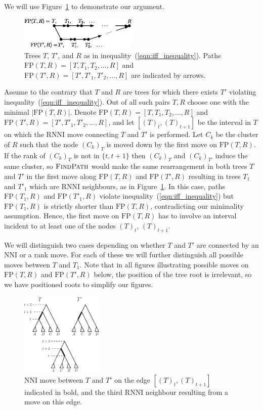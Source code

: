 \documentclass[11pt]{amsart}
\newcommand{\rnni}{\mathrm{RNNI}}
\newcommand{\findpath}{\textsc{FindPath}}
\newcommand{\nni}{\mathrm{NNI}}
\newcommand{\fp}{\mathrm{FP}}
\begin{document}
We will use Figure~\ref{fig:proof_idea} to demonstrate our argument.

\begin{figure}[ht]
\centering
\includegraphics[width=0.5\textwidth]{proof_idea_ag}
\caption{Trees $T$, $T'$, and $R$ as in inequality~(\ref{eqn:iff_inequality}).
Paths $\fp(T,R) = [T,T_1,T_2, \ldots, R]$ and $\fp(T',R) = [T',T'_1,T'_2, \ldots, R]$ are indicated by arrows.}
\label{fig:proof_idea}
\end{figure}

Assume to the contrary that $T$ and $R$ are trees for which there exists $T'$ violating inequality~(\ref{eqn:iff_inequality}).
Out of all such pairs $T, R$ choose one with the minimal $|\fp(T, R)|$.
Denote $\fp(T,R) = [T, T_1, T_2, \ldots, R]$ and $\fp(T', R) = [T', T'_1, T'_2, \ldots, R]$, and let $[(T)_t, (T)_{t+1}]$ be the interval in $T$ on which the $\rnni$ move connecting $T$ and $T'$ is performed.
Let $C_k$ be the cluster of $R$ such that the node $(C_k)_T$ is moved down by the first move on $\fp(T, R)$.
If the rank of $(C_k)_T$ is not in $\{t, t+1\}$ then $(C_k)_T$ and $(C_k)_{T'}$ induce the same cluster, so $\findpath$ would make the same rearrangement in both trees $T$ and $T'$ in the first move along $\fp(T, R)$ and $\fp(T', R)$ resulting in trees $T_1$ and $T'_1$ which are $\rnni$ neighbours, as in Figure~\ref{fig:proof_idea}.
In this case, paths $\fp(T_1, R)$ and $\fp(T'_1, R)$ violate inequality~(\ref{eqn:iff_inequality}) but $\fp(T_1, R)$ is strictly shorter than $\fp(T, R)$, contradicting our minimality assumption.
Hence, the first move on $\fp(T, R)$ has to involve an interval incident to at least one of the nodes $(T)_t$, $(T)_{t+1}$.

We will distinguish two cases depending on whether $T$ and $T'$ are connected by an $\nni$ or a rank move.
For each of these we will further distinguish all possible moves between $T$ and $T_1$.
Note that in all figures illustrating possible moves on $\fp(T,R)$ and $\fp(T',R)$ below, the position of the tree root is irrelevant, so we have positioned roots to simplify our figures.

\begin{figure}[ht]
\centering
\includegraphics[width=0.35\textwidth]{thm_fp_nni1}
\caption{$\nni$ move between $T$ and $T'$ on the edge $[(T)_t,(T)_{t+1}]$ indicated in bold, and the third $\rnni$ neighbour resulting from a move on this edge.}
\label{fig:thm_fp_nni1}
\end{figure}
\end{document}
